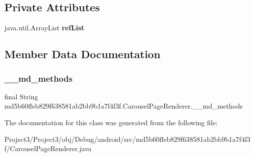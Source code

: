 \subsection*{Private Attributes}
\begin{DoxyCompactItemize}
\item 
\mbox{\label{classmd5b60ffeb829f638581ab2bb9b1a7f4f3f_1_1CarouselPageRenderer_a01f3b95caffdb860759fbe4bafdefc03}} 
java.\+util.\+Array\+List {\bfseries ref\+List}
\end{DoxyCompactItemize}


\subsection{Member Data Documentation}
\mbox{\label{classmd5b60ffeb829f638581ab2bb9b1a7f4f3f_1_1CarouselPageRenderer_aa7c3e4156a49e5c3fe304722e1b5019c}} 
\subsubsection{\texorpdfstring{\+\_\+\+\_\+md\+\_\+methods}{\_\_md\_methods}}
{\footnotesize\ttfamily final String md5b60ffeb829f638581ab2bb9b1a7f4f3f.\+Carousel\+Page\+Renderer.\+\_\+\+\_\+md\+\_\+methods\hspace{0.3cm}{\ttfamily [static]}}



The documentation for this class was generated from the following file\+:\begin{DoxyCompactItemize}
\item 
Project3/\+Project3/obj/\+Debug/android/src/md5b60ffeb829f638581ab2bb9b1a7f4f3f/Carousel\+Page\+Renderer.\+java\end{DoxyCompactItemize}

